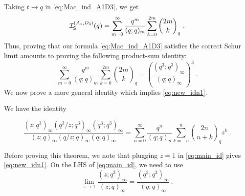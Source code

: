 \documentclass[a4paper,10pt]{article}
\newcommand{\mr}[1]{\mathsf{#1}}
\newcommand{\tsf}[1]{\textsf{#1}}
\def\CI {{\cal I}}
\def\CI {{{\cal I}}}
\begin{document}
Taking $t\to q$ in \eqref{eq:Mac_ind_A1D3}, we get 
\begin{equation}
    \CI_{\mr{S}}^{(A_1,D_3)}(q)=\sum_{m=0}^\infty 
    \frac{q^m}{(q;q)_m} \sum_{k=0}^{2m}\binom{2m}{k}_q~.    
\end{equation}
Thus, proving that our formula \eqref{eq:Mac_ind_A1D3} satisfies the correct Schur limit amounts to proving the following product-sum identity:
\begin{equation}\label{eq:new_idn1}
\sum_{m=0}^\infty 
    \frac{q^m}{(q;q)_m}\sum_{k=0}^{2m}\binom{2m}{k}_q=\left(\frac{\left(q^3 ; q^3\right)_{\infty}}{(q ; q)_{\infty}}\right)^3~.    
\end{equation}
We now prove a more general identity which implies \eqref{eq:new_idn1}.
\begin{thm}\label{thm:main_id}
We have the identity

\begin{equation}\label{eq:main_id}
\frac{\left(z ; q^3\right)_{\infty}\left(q^3 / z ; q^3\right)_{\infty}\left(q^3 ; q^3\right)_{\infty}}{(z ; q)_{\infty}(q / z ; q)_{\infty}(q ; q)_{\infty}}=\sum_{n=0}^{\infty} \frac{q^n}{(q ; q)_n} \sum_{k=-n}^n{
2 n \choose
n+k}_q z^k~.
\end{equation}    
\end{thm}
Before proving this theorem, we note that plugging $z=1$ in \eqref{eq:main_id} gives \eqref{eq:new_idn1}. On the \tsf{LHS} of \eqref{eq:main_id}, we need to use 
\begin{equation}
    \lim_{z\to 1}\frac{\left(z ; q^3\right)_{\infty}}{\left(z ; q\right)_{\infty}}=\frac{\left(q^3 ; q^3\right)_{\infty}}{\left(q ; q\right)_{\infty}}~.
\end{equation}
\end{document}
